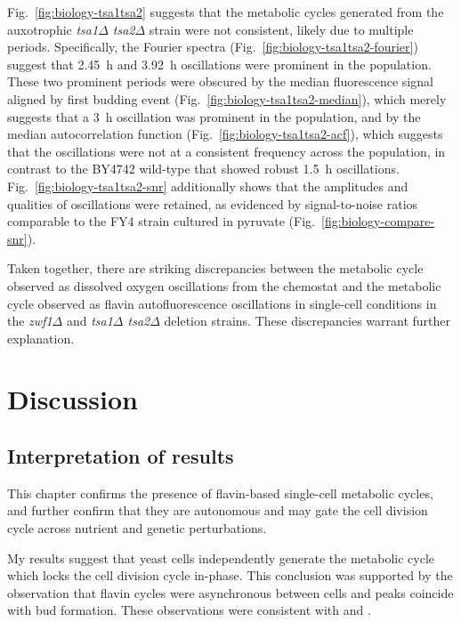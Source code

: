 Fig.\ \ref{fig:biology-tsa1tsa2} suggests that the metabolic cycles generated from the auxotrophic \textit{tsa1$\Delta$ tsa2$\Delta$} strain were not consistent, likely due to multiple periods.
Specifically, the Fourier spectra (Fig.\ \ref{fig:biology-tsa1tsa2-fourier}) suggest that \SI{2.45}{\hour} and \SI{3.92}{\hour} oscillations were prominent in the population.
These two prominent periods were obscured by the median fluorescence signal aligned by first budding event (Fig.\ \ref{fig:biology-tsa1tsa2-median}), which merely suggests that a \SI{3}{\hour} oscillation was prominent in the population, and by the median autocorrelation function (Fig.\ \ref{fig:biology-tsa1tsa2-acf}), which suggests that the oscillations were not at a consistent frequency across the population, in contrast to the BY4742 wild-type that showed robust \SI{1.5}{\hour} oscillations.
Fig.\ \ref{fig:biology-tsa1tsa2-snr} additionally shows that the amplitudes and qualities of oscillations were retained, as evidenced by signal-to-noise ratios comparable to the FY4 strain cultured in pyruvate (Fig.\ \ref{fig:biology-compare-snr}).%

Taken together, there are striking discrepancies between the metabolic cycle observed as dissolved oxygen oscillations from the chemostat and the metabolic cycle observed as flavin autofluorescence oscillations in single-cell conditions in the \textit{zwf1$\Delta$} and \textit{tsa1$\Delta$ tsa2$\Delta$} deletion strains.
These discrepancies warrant further explanation.


\section{Discussion}
\label{sec:biology-discussion}

\subsection{Interpretation of results}
\label{subsec:biology-discussion-interpretation}

This chapter confirms the presence of flavin-based single-cell metabolic cycles, and further confirm that they are autonomous and may gate the cell division cycle across nutrient and genetic perturbations.

My results suggest that yeast cells independently generate the metabolic cycle which locks the cell division cycle in-phase.
This conclusion was supported by the observation that flavin cycles were asynchronous between cells and peaks coincide with bud formation.
These observations were consistent with \textcite{papagiannakisAutonomousMetabolicOscillations2017} and \textcite{baumgartnerFlavinbasedMetabolicCycles2018}.

